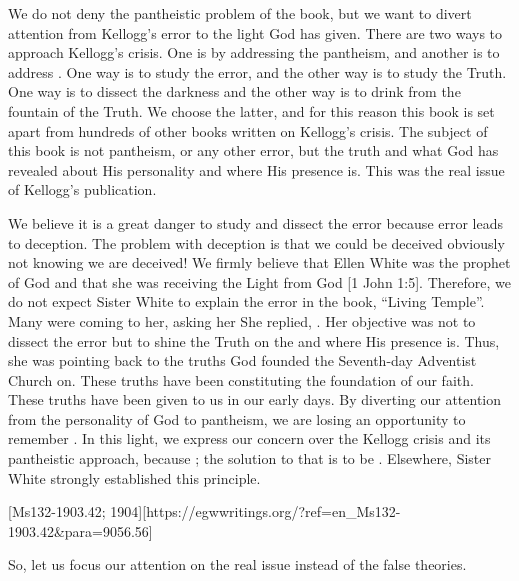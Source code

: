 We do not deny the pantheistic problem of the book, but we want to divert attention from Kellogg’s error to the light God has given. There are two ways to approach Kellogg’s crisis. One is by addressing the pantheism, and another is to address . One way is to study the error, and the other way is to study the Truth. One way is to dissect the darkness and the other way is to drink from the fountain of the Truth. We choose the latter, and for this reason this book is set apart from hundreds of other books written on Kellogg’s crisis. The subject of this book is not pantheism, or any other error, but the truth and what God has revealed about His personality and where His presence is. This was the real issue of Kellogg’s publication. 

We believe it is a great danger to study and dissect the error because error leads to deception. The problem with deception is that we could be deceived obviously not knowing we are deceived! We firmly believe that Ellen White was the prophet of God and that she was receiving the Light from God [1 John 1:5]. Therefore, we do not expect Sister White to explain the error in the book, “Living Temple”. Many were coming to her, asking her  She replied, . Her objective was not to dissect the error but to shine the Truth on the  and where His presence is. Thus, she was pointing back to the truths God founded the Seventh-day Adventist Church on. These truths have been constituting the foundation of our faith. These truths have been given to us in our early days. By diverting our attention from the personality of God to pantheism, we are losing an opportunity to remember . In this light, we express our concern over the Kellogg crisis and its pantheistic approach, because ; the solution to that is to be . Elsewhere, Sister White strongly established this principle.

[Ms132-1903.42; 1904][https://egwwritings.org/?ref=en\_Ms132-1903.42&para=9056.56]

So, let us focus our attention on the real issue instead of the false theories. 
